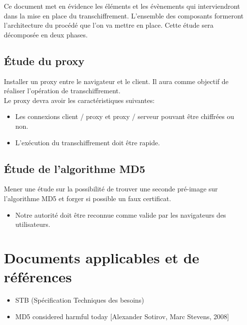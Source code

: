 \documentclass[a4paper,11pt,french]{article}
\begin{document}
Ce document met en évidence les éléments et les évènements qui interviendront dans la mise en place du transchiffrement. L'ensemble des composants formeront l'architecture du procédé que l'on va mettre en place. Cette étude sera décomposée en deux phases.  

\subsection{\'Etude du proxy}
Installer un proxy entre le navigateur et le client. Il aura comme objectif de réaliser l'opération de transchiffrement.  \\
Le proxy devra avoir les caractéristiques suivantes:
\begin{itemize}
\item Les connexions client / proxy et proxy / serveur pouvant être  chiffrées ou non.
\item L'exécution du transchiffrement doit être rapide.
\end{itemize}

\subsection{\'Etude de l'algorithme MD5}
Mener une étude sur la possibilité de trouver une seconde pré-image sur l'algorithme MD5 et forger si possible un faux certificat.  \\ 
\begin{itemize}
\item Notre autorité doit être reconnue comme valide par les navigateurs des utilisateurs.
\end{itemize}



\section{Documents applicables et de références}
\begin{itemize}
\item STB (Spécification Techniques des besoins)
\item MD5 considered harmful today [Alexander Sotirov, Marc Stevens, 2008]
\end{itemize}



\end{document}
